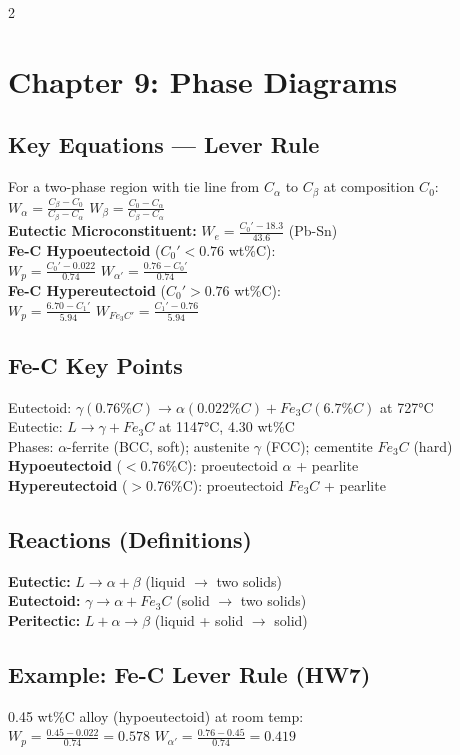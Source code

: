 \documentclass[7pt]{article}
\begin{document}
\begin{multicols*}{2}
\section*{Chapter 9: Phase Diagrams}
\subsection*{Key Equations — Lever Rule}
For a two-phase region with tie line from $C_\alpha$ to $C_\beta$ at composition $C_0$: \\
$W_\alpha = \frac{C_\beta - C_0}{C_\beta - C_\alpha}$ \quad $W_\beta = \frac{C_0 - C_\alpha}{C_\beta - C_\alpha}$ \\
\textbf{Eutectic Microconstituent:} $W_e = \frac{C_0' - 18.3}{43.6}$ (Pb-Sn) \\
\textbf{Fe-C Hypoeutectoid} ($C_0' < 0.76$ wt\%C): \\
$W_p = \frac{C_0' - 0.022}{0.74}$ \quad $W_{\alpha'} = \frac{0.76 - C_0'}{0.74}$ \\
\textbf{Fe-C Hypereutectoid} ($C_0' > 0.76$ wt\%C): \\
$W_p = \frac{6.70 - C_1'}{5.94}$ \quad $W_{Fe_3C'} = \frac{C_1' - 0.76}{5.94}$
\subsection*{Fe-C Key Points}
Eutectoid: $\gamma(0.76\%C) \rightarrow \alpha(0.022\%C) + Fe_3C(6.7\%C)$ at 727°C \\
Eutectic: $L \rightarrow \gamma + Fe_3C$ at 1147°C, 4.30 wt\%C \\
Phases: $\alpha$-ferrite (BCC, soft); austenite $\gamma$ (FCC); cementite $Fe_3C$ (hard) \\
\textbf{Hypoeutectoid} ($<$0.76\%C): proeutectoid $\alpha$ + pearlite \\
\textbf{Hypereutectoid} ($>$0.76\%C): proeutectoid $Fe_3C$ + pearlite
\subsection*{Reactions (Definitions)}
\textbf{Eutectic:} $L \rightarrow \alpha + \beta$ (liquid $\to$ two solids) \\
\textbf{Eutectoid:} $\gamma \rightarrow \alpha + Fe_3C$ (solid $\to$ two solids) \\
\textbf{Peritectic:} $L + \alpha \rightarrow \beta$ (liquid + solid $\to$ solid)
\subsection*{Example: Fe-C Lever Rule (HW7)}
0.45 wt\%C alloy (hypoeutectoid) at room temp: \\
$W_p = \frac{0.45 - 0.022}{0.74} = 0.578$ \quad $W_{\alpha'} = \frac{0.76-0.45}{0.74} = 0.419$


\end{multicols*}
\end{document}
